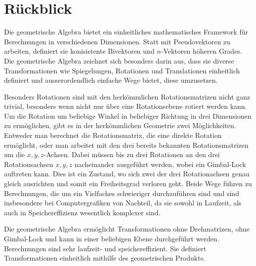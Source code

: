 \section{Rückblick}
Die geometrische Algebra bietet ein einheitliches mathematisches Framework für Berechnungen
in verschiedenen Dimensionen. Statt mit Pseudovektoren zu arbeiten, definiert sie konisistente
Bivektoren und $n$-Vektoren höheren Grades. Die geometrische Algebra zeichnet sich besonders
darin aus, dass sie diverse Transformationen wie Spiegelungen, Rotationen und Translationen
einheitlich definiert und ausserordendlich einfache Wege bietet, diese umzusetzen.

Besonders Rotationen sind mit den herkömmlichen Rotationsmatrizen nicht ganz trivial, besonders wenn
nicht nur über eine Rotationsebene rotiert werden kann. Um die Rotation um beliebige Winkel in beliebiger
Richtung in drei Dimensionen zu ermöglichen, gibt es in der herkömmlichen Geometrie zwei Möglichkeiten. Entweder
man berechnet die Rotationsmatrix, die eine direkte Rotation ermöglicht, oder man arbeitet mit den drei bereits bekannten
Rotationsmatrizen um die $x, y, z$-Achsen. Dabei müssen bis zu drei
Rotationen an den drei Rotationsachsen $x, y, z$ nacheinander ausgeführt werden, wobei ein
Gimbal-Lock
%
\cite{geoalgebra:gimbal-lock}
auftreten kann. Dies ist ein Zustand, wo sich zwei der drei Rotationachsen genau gleich ausrichten und somit ein Freiheitsgrad verloren geht.
Beide Wege führen zu Berechnungen, die um ein Vielfaches
schwieriger durchzuführen sind und sind insbesondere bei Computergrafiken von Nachteil, da sie sowohl in Laufzeit,
als auch in Speichereffizienz wesentlich komplexer sind.

Die geometrische Algebra ermöglicht Transformationen ohne Drehmatrizen, ohne Gim\-bal-Lock und kann in einer beliebigen
Ebene durchgeführt werden. Berechnungen sind sehr laufzeit- und speichereffizient.
Sie definiert Transformationen einheitlich mithilfe des geometrischen Produkts.
